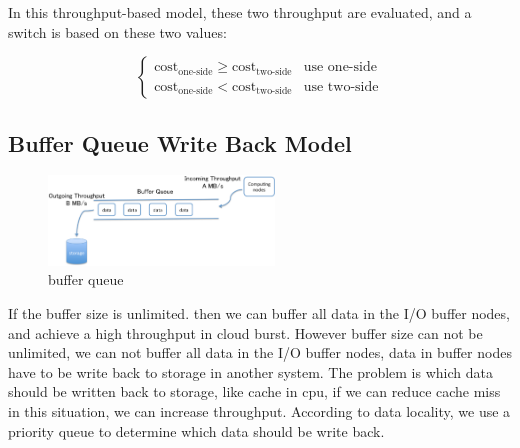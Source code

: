 \documentclass[JIP,draft]{ipsj}
\begin{document}
In this throughput-based model, these two throughput are evaluated, and a switch is based on these two values:

\begin{equation}
	\begin{cases}
		\text{cost}_{\text{one-side}} \geq \text{cost}_{\text{two-side}} & \text{use one-side}\\
		\text{cost}_{\text{one-side}} < \text{cost}_{\text{two-side}} & \text{use two-side}
	\end{cases}
\end{equation}

\subsection{Buffer Queue Write Back Model}

\begin{figure}[tb]
	\centering
	\includegraphics[width=6cm]{buffer_queue}
	\caption{buffer queue}
	\label{buffer queue}
\end{figure}

If the buffer size is unlimited. then we can buffer all data in the I/O buffer nodes, and achieve a high throughput in cloud burst.
However buffer size can not be unlimited, we can not buffer all data in the I/O buffer nodes, data in buffer nodes have to be write back to storage in another system.
The problem is which data should be written back to storage, like cache in cpu, if we can reduce cache miss in this situation, we can increase throughput. 
According to data locality, we use a priority queue to determine which data should be write back.
\end{document}

